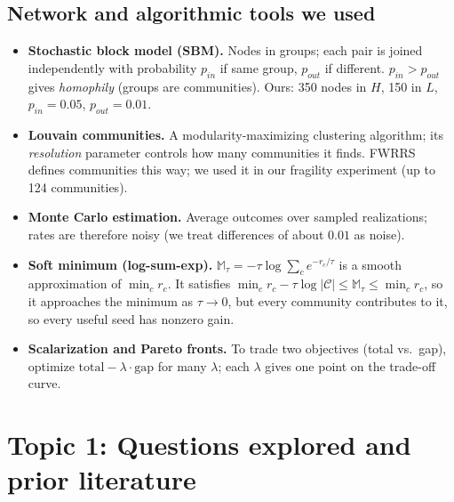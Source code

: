 \documentclass[11pt]{article}
\newcommand{\M}{\mathbb{M}}
\begin{document}
\subsection{Network and algorithmic tools we used}
\begin{itemize}
\item \textbf{Stochastic block model (SBM).} Nodes in groups; each pair is joined independently with probability $p_{in}$ if same group, $p_{out}$ if different. $p_{in}>p_{out}$ gives \emph{homophily} (groups are communities). Ours: 350 nodes in $H$, 150 in $L$, $p_{in}=0.05$, $p_{out}=0.01$.
\item \textbf{Louvain communities.} A modularity-maximizing clustering algorithm; its \emph{resolution} parameter controls how many communities it finds. FWRRS defines communities this way; we used it in our fragility experiment (up to 124 communities).
\item \textbf{Monte Carlo estimation.} Average outcomes over sampled realizations; rates are therefore noisy (we treat differences of about $0.01$ as noise).
\item \textbf{Soft minimum (log-sum-exp).} $\M_\tau=-\tau\log\sum_c e^{-r_c/\tau}$ is a smooth approximation of $\min_c r_c$. It satisfies $\min_c r_c-\tau\log|\mathcal C|\le\M_\tau\le\min_c r_c$, so it approaches the minimum as $\tau\to0$, but every community contributes to it, so every useful seed has nonzero gain.
\item \textbf{Scalarization and Pareto fronts.} To trade two objectives (total vs.\ gap), optimize $\text{total}-\lambda\cdot\text{gap}$ for many $\lambda$; each $\lambda$ gives one point on the trade-off curve.
\end{itemize}

\section{Topic 1: Questions explored and prior literature}\label{sec:q1}
\end{document}
